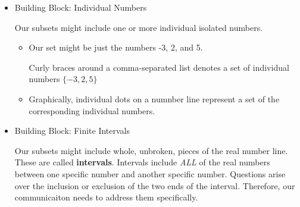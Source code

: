 \documentclass{ximera}
\begin{document}
\begin{itemize}
\item Building Block: Individual Numbers

Our subsets might include one or more individual isolated numbers.  
	\begin{itemize}
	\item Our set might be just the numbers -3, 2, and 5.

	Curly braces around a comma-separated list denotes a set of individual numbers $\{ -3, 2, 5 \}$

	\item Graphically, individual dots on a numnber line represent a set of the corresponding individual numbers.

	\begin{image}
	\end{image}



	\end{itemize}



\item  Building Block: Finite Intervals

Our subsets might include whole, unbroken, pieces of the real number line.  These are called \textbf{intervals}.   Intervals  include \textit{ALL} of the real numbers between one specific number and another specific number.  Questions arise over the inclusion or exclusion of the two ends of the interval. Therefore, our communicaiton needs to address them specifically.


\end{itemize}
\end{document}
